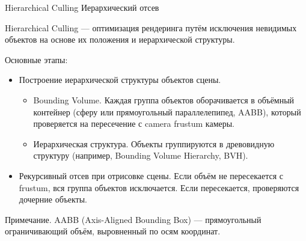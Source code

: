 \documentclass{beamer}
\begin{document}
	\begin{frame}{Hierarchical Culling }{Иерархический отсев}
		
		Hierarchical Culling --- оптимизация рендеринга путём исключения невидимых объектов на основе их положения и иерархической структуры.


		Основные этапы:
		\begin{itemize}
			\item 	
			Построение иерархической структуры объектов сцены.
			\begin{itemize}
				\item 
				Bounding Volume. Каждая группа объектов оборачивается в объёмный контейнер (сферу или прямоугольный параллелепипед, AABB), который проверяется на пересечение с camera frustum камеры.
				\item 
				Иерархическая структура. Объекты группируются в древовидную структуру (например, Bounding Volume Hierarchy, BVH).
			\end{itemize}
			\item 
			Рекурсивный отсев при отрисовке сцены. Если объём не пересекается с frustum, вся группа объектов исключается. Если пересекается, проверяются дочерние объекты.
		\end{itemize}
	
		{
			\footnotesize
			Примечание. 
			AABB (Axis-Aligned Bounding Box) --- прямоугольный ограничивающий объём, выровненный по осям координат.
		}


	\end{frame}
\end{document}
